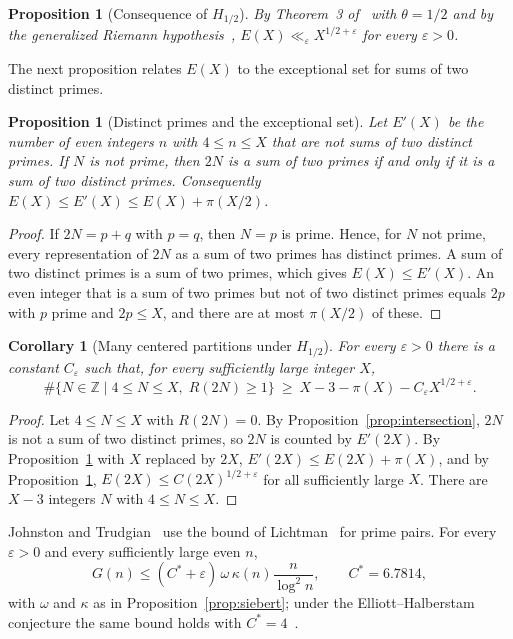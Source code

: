 \documentclass[11pt]{amsart}
\newtheorem{Proposition}[Theorem]{Proposition}
\newtheorem{Corollary}[Theorem]{Corollary}
\theoremstyle{definition}
\theoremstyle{remark}
\begin{document}
\begin{Proposition}[Consequence of $H_{1/2}$]\label{prop:E-half}
By Theorem~3 of~\cite{pintz2026exceptional} with $\theta=1/2$ and by the generalized Riemann hypothesis~\cite{alpoge2026}, $E(X)\ll_\varepsilon X^{1/2+\varepsilon}$ for every $\varepsilon>0$.
\end{Proposition}

The next proposition relates $E(X)$ to the exceptional set for sums of two distinct primes.
\begin{Proposition}[Distinct primes and the exceptional set]\label{prop:E-distinct}
Let $E'(X)$ be the number of even integers $n$ with $4\leq n\leq X$ that are not sums of two distinct primes. If $N$ is not prime, then $2N$ is a sum of two primes if and only if it is a sum of two distinct primes. Consequently $E(X)\leq E'(X)\leq E(X)+\pi(X/2)$.
\end{Proposition}
\begin{proof}
If $2N=p+q$ with $p=q$, then $N=p$ is prime. Hence, for $N$ not prime, every representation of $2N$ as a sum of two primes has distinct primes. A sum of two distinct primes is a sum of two primes, which gives $E(X)\leq E'(X)$. An even integer that is a sum of two primes but not of two distinct primes equals $2p$ with $p$ prime and $2p\leq X$, and there are at most $\pi(X/2)$ of these.
\end{proof}

\begin{Corollary}[Many centered partitions under $H_{1/2}$]\label{cor:cnt-GRH}
For every $\varepsilon>0$ there is a constant $C_\varepsilon$ such that, for every sufficiently large integer $X$,
\[
\#\{N\in\mathbb Z\mid 4\leq N\leq X,\; R(2N)\geq 1\}\ \geq\ X-3-\pi(X)-C_\varepsilon X^{1/2+\varepsilon}.
\]
\end{Corollary}
\begin{proof}
Let $4\leq N\leq X$ with $R(2N)=0$. By Proposition~\ref{prop:intersection}, $2N$ is not a sum of two distinct primes, so $2N$ is counted by $E'(2X)$. By Proposition~\ref{prop:E-distinct} with $X$ replaced by $2X$, $E'(2X)\leq E(2X)+\pi(X)$, and by Proposition~\ref{prop:E-half}, $E(2X)\leq C(2X)^{1/2+\varepsilon}$ for all sufficiently large $X$. There are $X-3$ integers $N$ with $4\leq N\leq X$.
\end{proof}

Johnston and Trudgian~\cite{johnston2026linnik} use the bound of Lichtman~\cite{lichtman2023goldbach} for prime pairs. For every $\varepsilon>0$ and every sufficiently large even $n$,
\begin{equation}\label{eq:lichtman}
G(n)\leq (C^*+\varepsilon)\,\omega\,\kappa(n)\frac{n}{\log^2 n},\qquad C^*=6.7814,
\end{equation}
with $\omega$ and $\kappa$ as in Proposition~\ref{prop:siebert}; under the Elliott--Halberstam conjecture the same bound holds with $C^*=4$~\cite{johnston2026linnik}.
\end{document}
